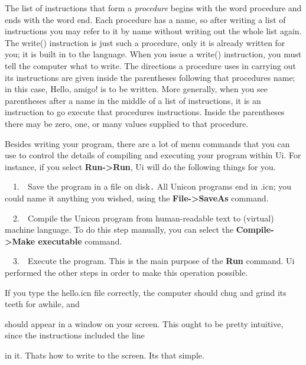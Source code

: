 The list of instructions that form a \textit{procedure }begins with the
word \textsf{procedure} and ends with the word \textsf{end}. Each
procedure has a name, so after writing a list of instructions you may
refer to it by name without writing out the whole list again. The
\textsf{write()} instruction is just such a procedure, only it is
already written for you; it is built in to the language. When you issue
a \textsf{write()} instruction, you must tell the computer what to
write. The directions a procedure uses in carrying out its instructions
are given inside the parentheses following that
procedure{\textquotesingle}s name; in this case,
\textsf{{\textquotedbl}Hello, amigo!{\textquotedbl}} is to be written.
More generally, when you see parentheses after a name in the middle of
a list of instructions, it is an instruction to go execute that
procedure{\textquotesingle}s instructions. Inside the parentheses there
may be zero, one, or many values supplied to that procedure.

Besides writing your program, there are a lot of menu commands that you
can use to control the details of compiling and executing your program
within Ui. For instance, if you select \textbf{Run-{\textgreater}Run},
Ui will do the following things for you.

\ \ 1.\ \ Save the program in a file on disk\texttt{.} All Unicon
programs end in \textsf{.icn}; you could name it anything you wished,
using the \textbf{File-{\textgreater}SaveAs} command.

\ \ 2.\ \ Compile the Unicon program from human-readable text to
(virtual) machine language. To do this step manually, you can select
the\newline
\textbf{Compile-{\textgreater}Make executable} command.

\ \ 3.\ \ Execute the program. This is the main purpose of the
\textbf{Run} command. Ui performed the other steps in order to make
this operation possible.

If you type the \textsf{hello.icn} file correctly, the computer should
chug and grind its teeth for awhile, and


\noindent should appear in a window on your screen. This ought to be pretty
intuitive, since the instructions included the line


\noindent in it. That{\textquotesingle}s how to write to the screen.
It{\textquotesingle}s that simple.

